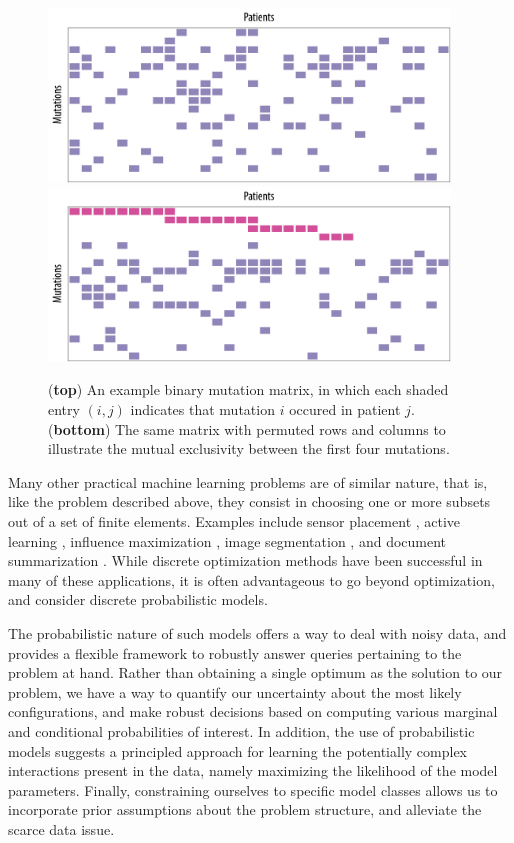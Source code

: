 \begin{figure}[tb]
\centering
\includegraphics[width=0.95\textwidth]{figures/intro/example1.pdf}\\[1em]
\includegraphics[width=0.95\textwidth]{figures/intro/example1_rep.pdf}\\[1em]
\caption{
(\textsf{\textbf{top}}) An example binary mutation matrix, in which each shaded entry $(i, j)$ indicates that mutation $i$ occured in patient $j$.
(\textsf{\textbf{bottom}}) The same matrix with permuted rows and columns to illustrate the mutual exclusivity between the first four mutations.
}
\label{fig:bamat}
\end{figure}

Many other practical machine learning problems are of similar nature, that is, like the problem described above, they consist in choosing one or more subsets out of a set of finite elements.
Examples include sensor placement \citep{krause06}, active learning \citep{golovin11}, influence maximization \citep{kempe03}, image segmentation \citep{jegelka11}, and document summarization \citep{lin11}.
While discrete optimization methods have been successful in many of these applications, it is often advantageous to go beyond optimization, and consider discrete probabilistic models.

The probabilistic nature of such models offers a way to deal with noisy data, and provides a flexible framework to robustly answer queries pertaining to the problem at hand.
Rather than obtaining a single optimum as the solution to our problem, we have a way to quantify our uncertainty about the most likely configurations, and make robust decisions based on computing various marginal and conditional probabilities of interest.
In addition, the use of probabilistic models suggests a principled approach for learning the potentially complex interactions present in the data, namely maximizing the likelihood of the model parameters.
Finally, constraining ourselves to specific model classes allows us to incorporate prior assumptions about the problem structure, and alleviate the scarce data issue.

